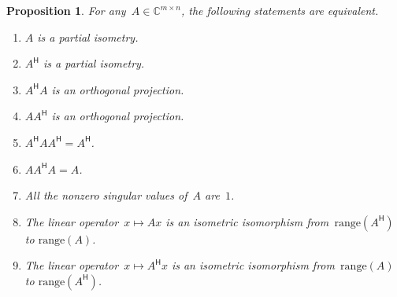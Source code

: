 \documentclass[11pt,a4paper]{article}  %
\numberwithin{equation}{section}
\newtheorem{proposition}{Proposition}%
\theoremstyle{definition}
\def\CC{\mathbb{C}}
\newcommand{\hmt}{{\scriptscriptstyle{{\mathsf{H}}}}}
\newcommand{\range}{\mathrm{range}}
\begin{document}
\begin{proposition}
  \label{prop:piso}
  For any~$A\in\CC^{m\times n}$, the following statements are equivalent.
  \begin{enumerate}[leftmargin=1.5em]
    \item \label{it:ai} $A$ is a partial isometry.
    \item \label{it:ahi} $A^\hmt$ is a partial isometry.
    \item \label{it:aha} $A^\hmt A$ is an orthogonal projection.
    \item \label{it:aah} $AA^\hmt$ is an orthogonal projection.
    \item \label{it:ahaah} $A^\hmt A A^\hmt = A^\hmt$.
    \item \label{it:aaha} $A A^\hmt A = A$.
    \item \label{it:sina} All the nonzero singular values of~$A$ are~$1$.
    \item \label{it:iso} The linear operator~$x \mapsto Ax$ is an isometric isomorphism from~$\range(A^\hmt)$ to $\range(A)$.
    \item \label{it:isoh} The linear operator~$x \mapsto A^\hmt x$ is an isometric isomorphism from~$\range(A)$ to $\range(A^\hmt)$.
  \end{enumerate}
\end{proposition}
\end{document}
